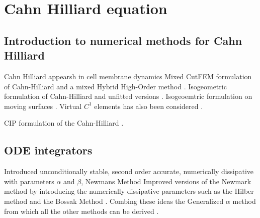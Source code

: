 
\newpage
\section{Cahn Hilliard equation }%
\label{sec:cahn_hilliard_equation}


\subsection{Introduction to numerical methods for Cahn Hilliard}%
\label{sub:introduction_to_numerical_methods_for_cahn_hilliard}

Cahn Hilliard appearsh in cell membrane dynamics \cite{bressloff2014stochastic}
Mixed CutFEM formulation of Cahn-Hilliard \cite{karatzas2021reduced} and a mixed Hybrid High-Order method \cite{chave2016hybrid}. Isogeometric formulation of Cahn-Hilliard \cite{kastner2016isogeometric, gomez2008isogeometric} and unfitted versions \cite{zhao2017variational}. Isogeoemtric formulation on moving
surfaces \cite{zimmermann2019isogeometric}. Virtual $C^{1}$  elements has also been considered \cite{antonietti2016c}.

CIP formulation of the Cahn-Hilliard \cite{wells2006discontinuous}.


\subsection{ODE integrators}%
\label{sub:ode_integrators}

      Introduced unconditionally stable, second order accurate, numerically dissipative with parameters $\alpha$ and $ \beta $,  Newmans Method \cite{newmark1959method}
    Improved versions of the Newmark method by introducing the numerically dissipative parameters such as the Hilber method and the Bossak Method \cite{hilber1977improved, wood1980alpha}. Combing these ideas the Generalized $\alpha $ method from which all the other methods can be derived \cite{chung1993time}.


\newpage

